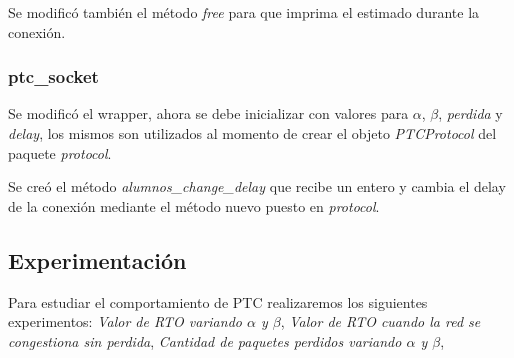     Se modific\'o tambi\'en el m\'etodo \textit{free} para que imprima el \rto{} 
    estimado durante la conexi\'on.        
    
    \subsubsection{ptc\_socket}
    Se modific\'o el wrapper, ahora se debe inicializar con valores para 
    $\alpha$, $\beta$, \textit{perdida} y \textit{delay}, los mismos son
    utilizados al momento de crear el objeto \textit{PTCProtocol} del 
    paquete \textit{protocol}.
    
    Se cre\'o el m\'etodo \textit{alumnos\_change\_delay} que recibe un
    entero y cambia el delay de la conexi\'on mediante el m\'etodo nuevo
    puesto en \textit{protocol}.
    
  \subsection{Experimentaci\'on}  
    Para estudiar el comportamiento de PTC realizaremos los siguientes
    experimentos:
    \emph{Valor de RTO variando $\alpha$ y $\beta$}, 
    \emph{Valor de RTO cuando la red se congestiona sin perdida},
    \emph{Cantidad de paquetes perdidos variando $\alpha$ y $\beta$},
    
